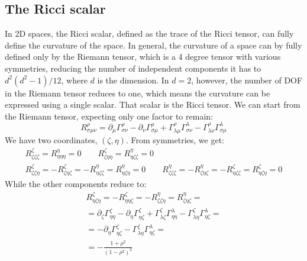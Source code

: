 \documentclass{article}
\begin{document}
\subsection{The Ricci scalar}
In 2D spaces, the Ricci scalar, defined as the trace of the Ricci tensor, can fully define the curvature of the space. In general, the curvature of a space can by fully defined only by the Riemann tensor, which is a 4 degree tensor with various symmetries, reducing the number of independent components it has to $d^2(d^2 - 1)/12$, where $d$ is the dimension. In $d=2$, however, the number of DOF in the Riemann tensor reduces to one, which means the curvature can be expressed using a single scalar. That scalar is the Ricci tensor.
\newline
We can start from the Riemann tensor, expecting only one factor to remain:
\begin{equation}
    R^{\rho}_{\sigma\mu\nu} = \partial_\mu\Gamma^\rho_{\sigma\nu} - \partial_\nu\Gamma^\rho_{\sigma\mu} + \Gamma^{\rho}_{\lambda\mu}\Gamma^\lambda_{\sigma\nu} - \Gamma^{\rho}_{\lambda\nu}\Gamma^\lambda_{\sigma\mu}
\end{equation}
We have two coordinates, $(\zeta, \eta)$. From symmetries, we get:
\begin{equation}
\begin{gathered}
    R^{\zeta}_{\zeta\zeta\zeta} = R^{\eta}_{\eta\eta\eta} = 0
    \qquad
    R^{\zeta}_{\zeta\eta\eta} = R^{\eta}_{\eta\zeta\zeta} = 0
    \\
    R^{\zeta}_{\zeta\zeta\eta} = -R^{\zeta}_{\zeta\eta\zeta} = -R^{\eta}_{\eta\zeta\zeta} = R^{\eta}_{\eta\zeta\eta} = 0
    \qquad
    R^{\eta}_{\zeta\zeta\zeta} = -R^{\eta}_{\zeta\eta\zeta} = -R^{\zeta}_{\eta\zeta\zeta} = R^{\zeta}_{\eta\zeta\eta} = 0
\end{gathered}
\end{equation}
While the other components reduce to:
\begin{equation}
\begin{gathered}
    R^{\zeta}_{\eta\zeta\eta} = -R^{\zeta}_{\eta\eta\zeta} = -R^{\eta}_{\zeta\zeta\eta} = R^{\eta}_{\zeta\eta\zeta} = \\ = \partial_\zeta \Gamma^\zeta_{\eta\eta} - \partial_\eta \Gamma^\zeta_{\eta\zeta} + \Gamma^\zeta_{\lambda\zeta}\Gamma^\lambda_{\eta\eta} - \Gamma^\zeta_{\lambda\eta}\Gamma^\lambda_{\eta\zeta} = \\ = -\partial_\eta \Gamma^\zeta_{\eta\zeta} - \Gamma^\zeta_{\lambda\eta}\Gamma^\lambda_{\eta\zeta} = \\ = -\frac{1 + \rho^2}{(1-\rho^2)^2}
\end{gathered}
\end{equation}
\end{document}
